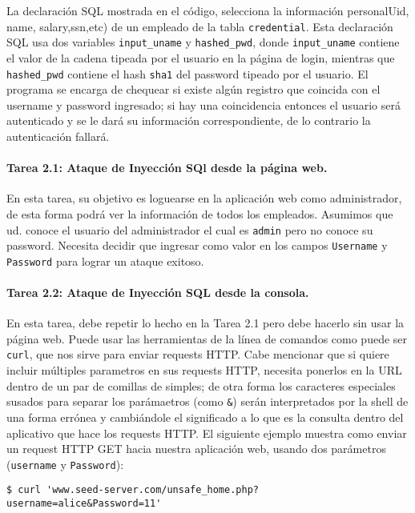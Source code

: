 La declaración SQL mostrada en el código, selecciona la información personalUid, name, salary,ssn,etc) de un empleado  de la tabla {\tt credential}. Esta declaración SQL usa dos variables \texttt{input\_uname} y \texttt{hashed\_pwd}, donde \texttt{input\_uname} contiene el valor de la cadena tipeada por el usuario en la página de login, mientras que \texttt{hashed\_pwd} contiene el hash \texttt{sha1} del password tipeado por el usuario. El programa se encarga de chequear si existe algún registro que coincida con el username y password ingresado; si hay una coincidencia entonces el usuario será autenticado y se le dará su información correspondiente, de lo contrario la autenticación fallará.


\paragraph{Tarea 2.1: Ataque de Inyección SQl desde la página web.}
En esta tarea, su objetivo es loguearse en la aplicación web como administrador, de esta forma podrá ver la información de todos los empleados. Asumimos que ud. conoce el usuario del administrador el cual es {\tt admin} pero no conoce su password. Necesita decidir que ingresar como valor en los campos \texttt{Username} y \texttt{Password} para lograr un ataque exitoso.
	

\paragraph{Tarea 2.2: Ataque de Inyección SQL desde la consola.}  
En esta tarea, debe repetir lo hecho en la Tarea 2.1 pero debe hacerlo sin usar la página web. Puede usar las herramientas de la línea de comandos como puede ser \texttt{curl}, que nos sirve para enviar requests HTTP.
Cabe mencionar que si quiere incluir múltiples parametros en sus requests HTTP, necesita ponerlos en la URL dentro de un par de comillas de simples; de otra forma los caracteres especiales susados para separar los parámaetros (como \texttt{\&}) serán interpretados por la shell de una forma errónea y cambiándole el significado a lo que es la consulta dentro del aplicativo que hace los requests HTTP. El siguiente ejemplo muestra como enviar un request HTTP GET hacia nuestra aplicación web, usando dos parámetros (\texttt{username} y \texttt{Password}):

\begin{lstlisting}
$ curl 'www.seed-server.com/unsafe_home.php?username=alice&Password=11'
\end{lstlisting}


